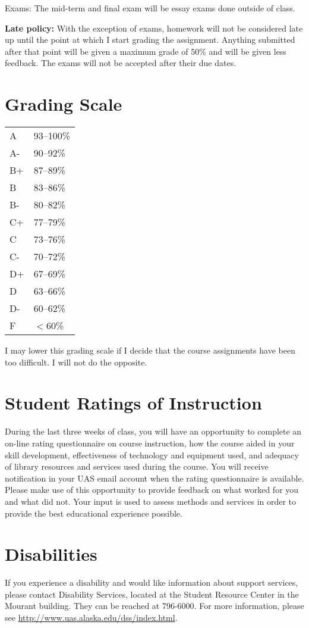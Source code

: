 \documentclass[11pt,letterpaper]{article}
\newcommand{\squeezeup}{\vspace{-2.5mm}}
\begin{document}
Exams: The mid-term and final exam will be essay exams done outside of class.

\textbf{Late policy:} With the exception of exams, homework will not be considered late up until the point at which I start grading the assignment. Anything submitted after that point will be given a maximum grade of 50\% and will be given less feedback. The exams will not be accepted after their due dates.

\clearpage
\section*{Grading Scale}
\begin{table}[h!]
\squeezeup
\begin{tabular}{ll}
A & 93--100\% \\
A- & 90--92\% \\
B+ & 87--89\% \\
B & 83--86\% \\
B- & 80--82\% \\
C+ & 77--79\% \\
C & 73--76\% \\
C- & 70--72\% \\
D+ & 67--69\% \\
D & 63--66\% \\
D- & 60--62\% \\
F & $<$60\%
\end{tabular}
\end{table}

I may lower this grading scale if I decide that the course assignments have been too difficult. I will not do the opposite.


\section*{Student Ratings of Instruction}
During the last three weeks of class, you will have an opportunity to complete an on-line rating questionnaire on course instruction, how the course aided in your skill development,  effectiveness of technology and equipment used, and adequacy of library resources and services used during the course. You will receive notification in your UAS email account when the rating questionnaire is available. Please make use of this opportunity to provide feedback on what worked for you and what did not. Your input is used to assess methods and services in order to provide the best educational experience possible.

\section*{Disabilities}
If you experience a disability and would like information about support services, please contact Disability Services, located at the Student Resource Center in the Mourant building.  They can be reached at 796-6000. For more information, please see \url{http://www.uas.alaska.edu/dss/index.html}.
\end{document}
